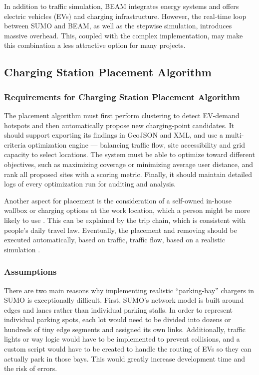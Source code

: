 In addition to traffic simulation, BEAM integrates energy systems and offers electric vehicles (EVs) and charging infrastructure. However, the real-time loop between SUMO and BEAM, as well as the stepwise simulation, introduces massive overhead. This, coupled with the complex implementation, may make this combination a less attractive option for many projects.

\clearpage
\subsection{Charging Station Placement Algorithm}

\subsubsection{Requirements for Charging Station Placement Algorithm}

The placement algorithm must first perform clustering to detect EV-demand hotspots and then automatically propose new charging-point candidates. It should support exporting its findings in GeoJSON and XML, and use a multi-criteria optimization engine — balancing traffic flow, site accessibility and grid capacity to select locations. The system must be able to optimize toward different objectives, such as maximizing coverage or minimizing average user distance, and rank all proposed sites with a scoring metric. Finally, it should maintain detailed logs of every optimization run for auditing and analysis. 

Another aspect for placement is the consideration of a self-owned in-house wallbox or charging options at the work location, which a person might be more likely to use \cite{ev_cs_planning_with_dyn_pred}. This can be explained by the trip chain, which is consistent with people's daily travel law. Eventually, the placement and removing should be executed automatically, based on traffic, traffic flow, based on a realistic simulation \cite{cs_ev_in_SUMO_impact_on_traffic_flow}.

\subsubsection{Assumptions}

There are two main reasons why implementing realistic “parking-bay” chargers in SUMO is exceptionally difficult. First, SUMO’s network model is built around edges and lanes rather than individual parking stalls. In order to represent individual parking spots, each lot would need to be divided into dozens or hundreds of tiny edge segments and assigned its own links. Additionally, traffic lights or way logic would have to be implemented to prevent collisions, and a custom script would have to be created to handle the routing of EVs so they can actually park in those bays. This would greatly increase development time and the risk of errors.

